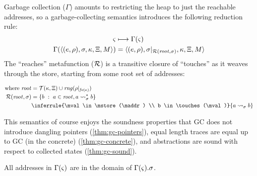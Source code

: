 \begin{SCodeFlow}
\begin{RktBlk}
\begin{SingleColumn}
\mbox{}\RktPn{(}\mbox{}\RktPn{(}\RktPn{[}\RktSym{$\mkont$}\mbox{}\RktPn{(}\mbox{}\RktPn{(}\mbox{}\RktSym{$\mktab$}\mbox{}\RktPn{)}\RktPn{)}\RktPn{]}\RktPn{)}

\mbox{}\RktPn{(}\mbox{}\RktSym{$\mkont$}\RktPn{)}\RktPn{)}\RktPn{]}\RktPn{)}\RktPn{]}\RktPn{)}\RktPn{)}\RktPn{)}\end{SingleColumn}\end{RktBlk}\end{SCodeFlow}

Garbage collection ($\Gamma$) amounts to restricting the heap to just the reachable addresses, so a garbage-collecting semantics introduces the following reduction rule:
\begin{align*}
  \varsigma &\longmapsto \Gamma(\varsigma) \\
  \Gamma(\langle (e,\rho),\sigma,\kappa, \Xi, M \rangle) &= \langle (e,\rho),\sigma|_{{\mathcal R}(\mathit{root}, \sigma)}, \kappa, \Xi, M \rangle \\
\end{align*}
%
The ``reaches'' metafunction (${\mathcal R}$) is a transitive closure of ``touches'' as it weaves through the store, starting from some root set of addresses:

\begin{align*}
  \text{where } \mathit{root} &= \touches(\mkont,\mktab) \cup \mathit{rng}(\menv|_{\mathit{fv}(\mexpr)}) \\
  \reaches(\mathit{root}, \mstore) &= \setbuild{b}{\maddr \in \mathit{root}, \maddr \rightsquigarrow_\mstore^* b} \\
   &
               \inferrule{\mval \in \mstore(\maddr) \\
                             b \in \touches(\mval)}
                            {\maddr \rightsquigarrow_\mstore b}
\end{align*}

This semantics of course enjoys the soundness properties that GC does not introduce dangling pointers (\autoref{thm:gc-pointers}), equal length traces are equal up to GC (in the concrete) (\autoref{thm:gc-concrete}), and abstractions are sound with respect to collected states (\autoref{thm:gc-sound}).
%
\begin{theorem}\label{thm:gc-pointers}
  All addresses in $\Gamma(\varsigma)$ are in the domain of $\Gamma(\varsigma).\sigma$.
\end{theorem}

